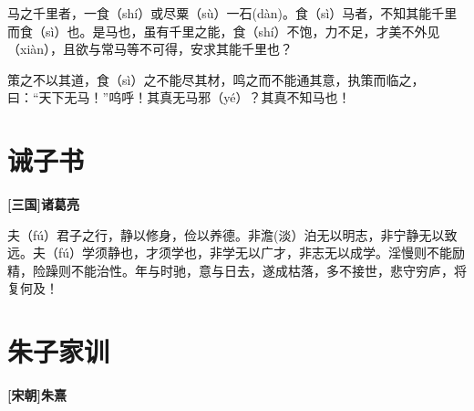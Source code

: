 \documentclass[UTF8,titlepage,oneside]{ctexbook}
\begin{document}
马之千里者，一食（shí）或尽粟（sù）一石(dàn)。食（sì）马者，不知其能千里而食（sì）也。是马也，虽有千里之能，食（shí）不饱，力不足，才美不外见（xiàn），且欲与常马等不可得，安求其能千里也？


策之不以其道，食（sì）之不能尽其材，鸣之而不能通其意，执策而临之，曰：“天下无马！”呜呼！其真无马邪（yé）？其真不知马也！



\chapter*{诫子书}
\begin{center}
	\textbf{[三国]诸葛亮}
\end{center}

夫（fú）君子之行，静以修身，俭以养德。非澹(淡）泊无以明志，非宁静无以致远。夫（fú）学须静也，才须学也，非学无以广才，非志无以成学。淫慢则不能励精，险躁则不能治性。年与时驰，意与日去，遂成枯落，多不接世，悲守穷庐，将复何及！





\chapter*{朱子家训}
\begin{center}
	\textbf{[宋朝]朱熹}
\end{center}
\end{document}
